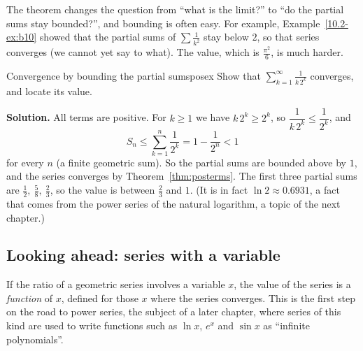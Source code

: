 \documentclass[11pt]{article}
\begin{document}
The theorem changes the question from ``what is the limit?'' to ``do the partial sums stay bounded?'', and bounding is often easy. For example, Example~\ref{10.2-ex:b10} showed that the partial sums of $\sum\frac1{k^2}$ stay below $2$, so that series converges (we cannot yet say to what). The value, which is $\frac{\pi^2}6$, is much harder.

\begin{exmp}{Convergence by bounding the partial sums}{posex}
Show that $\displaystyle\sum_{k=1}^\infty\frac1{k\,2^k}$ converges, and locate its value.

\textbf{Solution.} All terms are positive. For $k\ge1$ we have $k\,2^k\ge2^k$, so $\dfrac1{k\,2^k}\le\dfrac1{2^k}$, and
\[
S_n\le\sum_{k=1}^n\frac1{2^k}=1-\frac1{2^n}<1
\]
for every $n$ (a finite geometric sum). So the partial sums are bounded above by $1$, and the series converges by Theorem~\ref{thm:posterms}. The first three partial sums are $\frac12,\ \frac58,\ \frac23$, so the value is between $\frac23$ and $1$. (It is in fact $\ln2\approx0.6931$, a fact that comes from the power series of the natural logarithm, a topic of the next chapter.)
\end{exmp}

\subsection*{Looking ahead: series with a variable}

If the ratio of a geometric series involves a variable $x$, the value of the series is a \emph{function} of $x$, defined for those $x$ where the series converges. This is the first step on the road to power series, the subject of a later chapter, where series of this kind are used to write functions such as $\ln x$, $e^x$ and $\sin x$ as ``infinite polynomials''.
\end{document}
